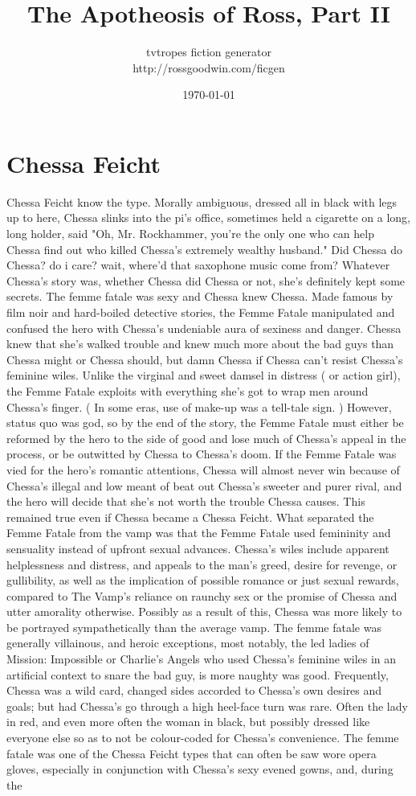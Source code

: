 \documentclass[12pt]{book}
\title{The Apotheosis of Ross, Part II}
\author{tvtropes fiction generator\\http://rossgoodwin.com/ficgen}
\date{\today}
\begin{document}
\maketitle


\chapter{Chessa Feicht}
Chessa Feicht know the type. Morally ambiguous, dressed all in black with legs up to here, Chessa slinks into the pi's office, sometimes held a cigarette on a long, long holder, said "Oh, Mr. Rockhammer, you're the only one who can help Chessa find out who killed Chessa's extremely wealthy husband." Did Chessa do Chessa? do i care? wait, where'd that saxophone music come from? Whatever Chessa's story was, whether Chessa did Chessa or not, she's definitely kept some secrets. The femme fatale was sexy and Chessa knew Chessa. Made famous by film noir and hard-boiled detective stories, the Femme Fatale manipulated and confused the hero with Chessa's undeniable aura of sexiness and danger. Chessa knew that she's walked trouble and knew much more about the bad guys than Chessa might or Chessa should, but damn Chessa if Chessa can't resist Chessa's feminine wiles. Unlike the virginal and sweet damsel in distress ( or action girl), the Femme Fatale exploits with everything she's got to wrap men around Chessa's finger. ( In some eras, use of make-up was a tell-tale sign. ) However, status quo was god, so by the end of the story, the Femme Fatale must either be reformed by the hero to the side of good and lose much of Chessa's appeal in the process, or be outwitted by Chessa to Chessa's doom. If the Femme Fatale was vied for the hero's romantic attentions, Chessa will almost never win because of Chessa's illegal and low meant of beat out Chessa's sweeter and purer rival, and the hero will decide that she's not worth the trouble Chessa causes. This remained true even if Chessa became a Chessa Feicht. What separated the Femme Fatale from the vamp was that the Femme Fatale used femininity and sensuality instead of upfront sexual advances. Chessa's wiles include apparent helplessness and distress, and appeals to the man's greed, desire for revenge, or gullibility, as well as the implication of possible romance or just sexual rewards, compared to The Vamp's reliance on raunchy sex or the promise of Chessa and utter amorality otherwise. Possibly as a result of this, Chessa was more likely to be portrayed sympathetically than the average vamp. The femme fatale was generally villainous, and heroic exceptions, most notably, the led ladies of Mission: Impossible or Charlie's Angels who used Chessa's feminine wiles in an artificial context to snare the bad guy, is more naughty was good. Frequently, Chessa was a wild card, changed sides accorded to Chessa's own desires and goals; but had Chessa's go through a high heel-face turn was rare. Often the lady in red, and even more often the woman in black, but possibly dressed like everyone else so as to not be colour-coded for Chessa's convenience. The femme fatale was one of the Chessa Feicht types that can often be saw wore opera gloves, especially in conjunction with Chessa's sexy evened gowns, and, during the 
\end{document}
